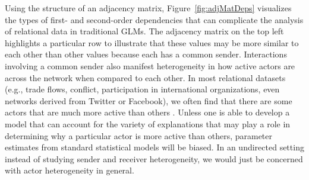 Using the structure of an adjacency matrix, Figure~\ref{fig:adjMatDeps} visualizes the types of first- and second-order dependencies that can complicate the analysis of relational data in traditional GLMs. The adjacency matrix on the top left highlights a particular row to illustrate that these values may be more similar to each other than other values because each has a common sender. Interactions involving a common sender also manifest heterogeneity in how active actors are across the network when compared to each other. In most relational datasets (e.g., trade flows, conflict, participation in international organizations, even networks derived from Twitter or Facebook), we often find that there are some actors that are much more active than others \citep{barabasi:reka:1999}. Unless one is able to develop a model that can account for the variety of explanations that may play a role in determining why a particular actor is more active than others, parameter estimates from standard statistical models will be biased. In an undirected setting instead of studying sender and receiver heterogeneity, we would just be concerned with actor heterogeneity in general. 


